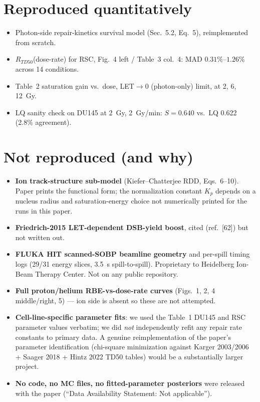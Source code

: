 \documentclass[11pt]{article}
\begin{document}
\section{Reproduced quantitatively}

\begin{itemize}
  \item Photon-side repair-kinetics survival model (Sec.~5.2, Eq.~5), reimplemented
        from scratch.
  \item $R_{TD50}$(dose-rate) for RSC, Fig.~4 left / Table~3 col.~4:
        MAD $0.31\%$--$1.26\%$ across 14 conditions.
  \item Table~2 saturation gain vs.\ dose, LET$\to$0 (photon-only) limit,
        at 2, 6, 12~Gy.
  \item LQ sanity check on DU145 at 2~Gy, 2~Gy/min: $S=0.640$ vs.\ LQ 0.622
        (2.8\% agreement).
\end{itemize}

\section{Not reproduced (and why)}

\begin{itemize}
  \item \textbf{Ion track-structure sub-model} (Kiefer--Chatterjee RDD,
        Eqs.~6--10). Paper prints the functional form; the normalization
        constant $K_p$ depends on a nucleus radius and saturation-energy
        choice not numerically printed for the runs in this paper.
  \item \textbf{Friedrich-2015 LET-dependent DSB-yield boost}, cited
        (ref.~[62]) but not written out.
  \item \textbf{FLUKA HIT scanned-SOBP beamline geometry} and per-spill
        timing logs (29/31 energy slices, 3.5~s spill-to-spill).
        Proprietary to Heidelberg Ion-Beam Therapy Center. Not on any
        public repository.
  \item \textbf{Full proton/helium RBE-vs-dose-rate curves} (Figs.~1, 2,
        4 middle/right, 5) --- ion side is absent so these are not attempted.
  \item \textbf{Cell-line-specific parameter fits}: we used the Table~1
        DU145 and RSC parameter values verbatim; we did \emph{not}
        independently refit any repair rate constants to primary data.
        A genuine reimplementation of the paper's parameter identification
        (chi-square minimization against Karger 2003/2006 + Saager 2018 +
        Hintz 2022 TD50 tables) would be a substantially larger project.
  \item \textbf{No code, no MC files, no fitted-parameter posteriors} were
        released with the paper (``Data Availability Statement: Not applicable'').
\end{itemize}
\end{document}
